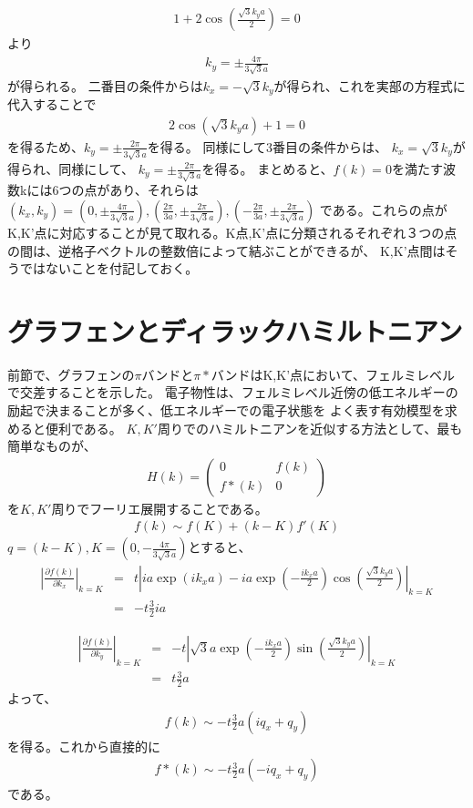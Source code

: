 \documentclass{article}
\begin{document}
\begin{eqnarray}
1+2\cos(\frac{\sqrt{3}k_y a}{2})=0
\end{eqnarray}
より
\begin{eqnarray}
k_y=\pm\frac{4\pi}{3\sqrt{3}a}
\end{eqnarray}
が得られる。
二番目の条件からは$k_x=-\sqrt{3}k_y$が得られ、これを実部の方程式に代入することで
\begin{eqnarray}
2\cos(\sqrt{3}k_y a)+1=0
\end{eqnarray}
を得るため、$k_y=\pm \frac{2\pi}{3\sqrt{3}a}$を得る。
同様にして3番目の条件からは、
$k_x=\sqrt{3}k_y$が得られ、同様にして、
$k_y=\pm \frac{2\pi}{3\sqrt{3}a}$を得る。
まとめると、$f(k)=0$を満たす波数kには6つの点があり、それらは
$(k_x,k_y)=(0,\pm\frac{4\pi}{3\sqrt{3}a}), (\frac{2\pi}{3a},\pm \frac{2\pi}{3\sqrt{3}a}),(-\frac{2\pi}{3a},\pm \frac{2\pi}{3\sqrt{3}a})$
である。これらの点がK,K'点に対応することが見て取れる。K点,K'点に分類されるそれぞれ３つの点の間は、逆格子ベクトルの整数倍によって結ぶことができるが、
K,K'点間はそうではないことを付記しておく。

\section{グラフェンとディラックハミルトニアン}
前節で、グラフェンの$\pi$バンドと$\pi*$バンドはK,K'点において、フェルミレベルで交差することを示した。
電子物性は、フェルミレベル近傍の低エネルギーの励起で決まることが多く、低エネルギーでの電子状態を
よく表す有効模型を求めると便利である。
$K,K'$周りでのハミルトニアンを近似する方法として、最も簡単なものが、
\begin{eqnarray}
H(k)=\left( 
 \begin{array}{cc}
	0 & f(k) \\
	f*(k) & 0
 \end{array}
\right)
\end{eqnarray}
を$K,K'$周りでフーリエ展開することである。
\begin{eqnarray}
f(k)\sim f(K)+(k-K)f'(K)
\end{eqnarray}
$q=(k-K), K=(0, -\frac{4\pi}{3\sqrt{3}a})$とすると、
\begin{eqnarray}
\left |\frac{\partial f(k)}{\partial k_x}\right |_{k=K}&=&t \left |ia \exp(ik_x a)-ia\exp(-\frac{ik_x a}{2})\cos(\frac{\sqrt{3}k_y a}{2})\right |_{k=K} \\
&=& -t \frac{3}{2} ia
\end{eqnarray}

\begin{eqnarray}
\left |\frac{\partial f(k)}{\partial k_y}\right |_{k=K}&=&-t \left |\sqrt{3}a\exp(-\frac{ik_x a}{2})\sin(\frac{\sqrt{3}k_y a}{2})\right |_{k=K} \\
&=& t\frac{3}{2} a
\end{eqnarray}
よって、
\begin{eqnarray}
f(k)\sim -t\frac{3}{2}a \left( iq_x+q_y\right)
\end{eqnarray}
を得る。これから直接的に
\begin{eqnarray}
f*(k)\sim -t\frac{3}{2}a \left( -iq_x+q_y\right)
\end{eqnarray}
である。
\end{document}
